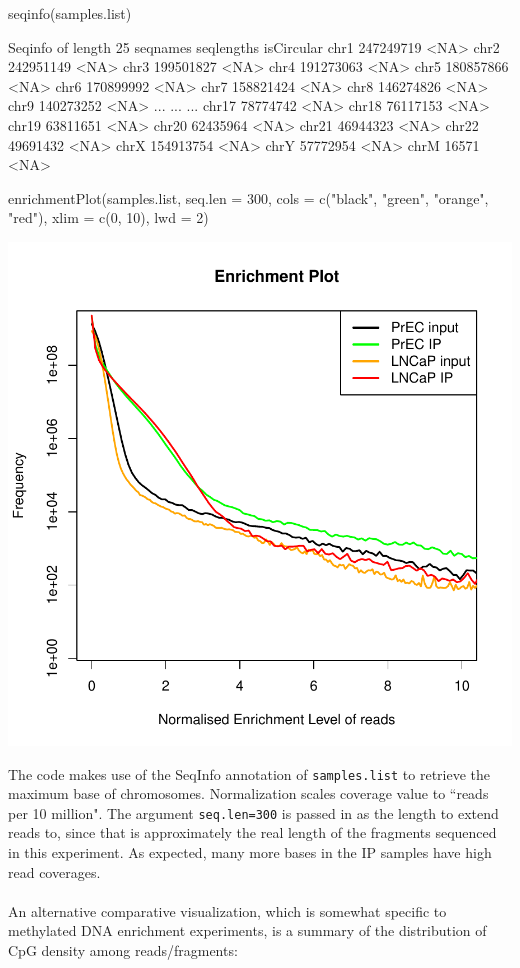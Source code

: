 \begin{Schunk}
\begin{Sinput}
 seqinfo(samples.list)
\end{Sinput}
\begin{Soutput}
Seqinfo of length 25
seqnames seqlengths isCircular
chr1      247249719       <NA>
chr2      242951149       <NA>
chr3      199501827       <NA>
chr4      191273063       <NA>
chr5      180857866       <NA>
chr6      170899992       <NA>
chr7      158821424       <NA>
chr8      146274826       <NA>
chr9      140273252       <NA>
...             ...        ...
chr17      78774742       <NA>
chr18      76117153       <NA>
chr19      63811651       <NA>
chr20      62435964       <NA>
chr21      46944323       <NA>
chr22      49691432       <NA>
chrX      154913754       <NA>
chrY       57772954       <NA>
chrM          16571       <NA>
\end{Soutput}
\begin{Sinput}
 enrichmentPlot(samples.list, seq.len = 300, cols = c("black", 
     "green", "orange", "red"), xlim = c(0, 10), lwd = 2)
\end{Sinput}
\end{Schunk}
\includegraphics{qc-enrPlot}

\noindent The code makes use of the SeqInfo annotation of \texttt{samples.list} to retrieve the maximum base of chromosomes.  Normalization scales coverage value to ``reads per 10 million". The argument \texttt{seq.len=300} is passed in as the length to extend reads to, since that is approximately the real length of the fragments sequenced in this experiment. As expected, many more bases in the IP samples have high read coverages. \\
\ \\
An alternative comparative visualization, which is somewhat specific to methylated DNA enrichment experiments, is a summary of the distribution of CpG density among reads/fragments:

